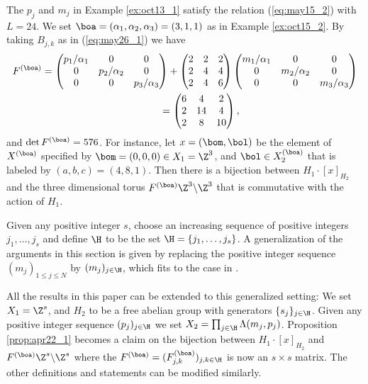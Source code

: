 \begin{example}\label{ex:oct15_4}
The $p_j$ and $m_j$ in Example \ref{ex:oct13_1} satisfy the relation (\ref{eq:may15_2}) with $L=24$.
We set $\boa = (\alpha_1, \alpha_2, \alpha_3) = (3,1,1)$ as in Example \ref{ex:oct15_2}.
By taking $B_{j,k}$ as in (\ref{eq:may26_1}) we have
\begin{gather*}
F^{(\boa)}  =
\begin{pmatrix}
p_1/\alpha_1  & 0 & 0 \\
0 &  p_2/\alpha_2  & 0 \\
0 & 0 &   p_3/\alpha_3
\end{pmatrix}
+
\begin{pmatrix}
2 & 2 & 2 \\
2 & 4 & 4 \\
2 & 4 & 6
\end{pmatrix}
\begin{pmatrix}
m_1/\alpha_1   & 0 & 0 \\
0 &  m_2/\alpha_2  & 0 \\
0 & 0 &   m_3/\alpha_3
\end{pmatrix}\\
\phantom{F^{(\boa)}}{}
 =
\begin{pmatrix}
6 & 4 & 2 \\
2 & 14 & 4 \\
2 & 8 & 10
\end{pmatrix}
,
\end{gather*}
and $\det F^{(\boa)} = 576$.
For instance, let $x = (\bom, \bol)$ be the element of $X^{(\boa)}$ specif\/ied by
$\bom = (0,0,0) \in X_1 = \Z^3$, and
$\bol \in X_2^{(\boa)}$ that is labeled by $(a,b,c) = (4,8,1)$.
Then there is a bijection between $H_1 \cdot [x]_{H_2}$ and
the three dimensional torus $F^{(\boa)} \Z^3 \backslash \Z^3$ that is commutative with the action of $H_1$.
\end{example}

%
\begin{remark}\label{rem:mar12_1}
Given any positive integer $s$, choose an increasing sequence of positive integers $j_1, \ldots ,j_s$
and def\/ine $\H$ to be the set $\H=\{j_1,\ldots,j_s\}$.
{A generalization of the arguments in this section is given by} replacing the positive integer sequence $(m_j)_{1 \leq j \leq N}$ by
$(m_j)_{j \in \H}$, which f\/its to the case in \cite{KTT}.

All the results in this paper can be extended to this generalized setting:
We set $X_1 = \Z^s$, and
$H_2$ to be a free abelian group with generators $\{ s_j \}_{j \in \H}$.
Given any {positive} integer sequence $(p_j)_{j \in \H}$
we set $X_2 = \prod_{j \in \H} \Lambda (m_j,p_j)$.
Proposition \ref{prop:apr22_1} becomes a claim on the bijection between
$H_1 \cdot [x]_{H_2}$ and $F^{(\boa)} \Z^s \backslash \Z^s$ where
the $F^{(\boa)}= (F^{(\boa)}_{j,k})_{j,k \in \H}$ is now an $s \times s$ matrix.
%
The other def\/initions and statements can be modif\/ied similarly.

\end{remark}
